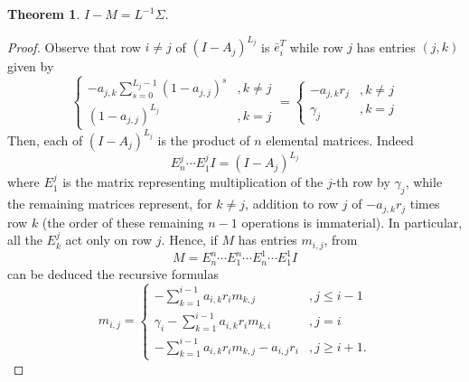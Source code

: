 \documentclass[]{interact}
\theoremstyle{plain}%
\newtheorem{theorem}{Theorem}
\theoremstyle{definition}
\theoremstyle{remark}
\begin{document}
\begin{theorem}
$I-M=L^{-1}\Sigma$.
\end{theorem}
\begin{proof}
Observe that row $i\neq j$ of $(I-A_j)^{L_j}$ is $\bar{e}_i^{T}$ while row $j$ has entries $(j,k)$ given by
\[
\begin{cases}
-a_{j,k}\sum_{s=0}^{L_j-1}(1-a_{j,j})^s& ,k\neq j\\
(1-a_{j,j})^{L_j}& ,k=j
\end{cases}=
\begin{cases}
-a_{j,k}r_j& ,k\neq j\\
\gamma_j & ,k=j
\end{cases}
\]
Then, each of $(I-A_j)^{L_j}$ is the product of $n$ elemental matrices. Indeed
\[
E^{j}_n\cdots E^{j}_1 I=(I-A_j)^{L_j}
\]
where $E^{j}_1$ is the matrix representing multiplication of the $j$-th row by $\gamma_j$, while the remaining matrices represent, for $k\neq j$, addition to row $j$ of $-a_{j,k}r_j$ times row $k$ (the order of these remaining $n-1$ operations is immaterial). In particular, all the $E^j_k$ act only on row $j$. 
Hence, if $M$ has entries $m_{i,j}$, from 
\[
M=E^{n}_n\cdots E^{n}_1 \cdots E^{1}_n\cdots E^{1}_1 I
\]
can be deduced the recursive formulas
\[
m_{i,j}=\begin{cases}
-\sum_{k=1}^{i-1}a_{i,k}r_im_{k,j} & , j\leq i-1 \\
\gamma_i -\sum_{k=1}^{i-1}a_{i,k}r_im_{k,i} &, j=i\\
-\sum_{k=1}^{i-1}a_{i,k}r_im_{k,j} -a_{i,j}r_i  &, j\geq i+1.
\end{cases}
\]


\end{proof}
\end{document}
